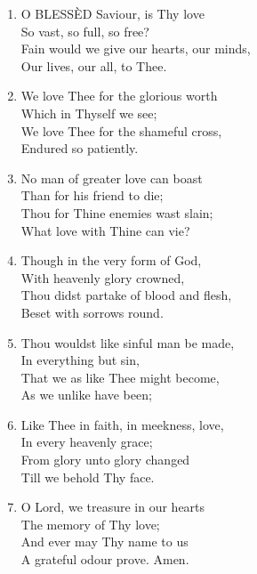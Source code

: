 \begin{enumerate}
    \item O BLESS\`ED Saviour, is Thy love \\
            So vast, so full, so free? \\
        Fain would we give our hearts, our minds, \\
            Our lives, our all, to Thee.

    \item We love Thee for the glorious worth \\
            Which in Thyself we see; \\
        We love Thee for the shameful cross, \\
            Endured so patiently.

    \item No man of greater love can boast \\
            Than for his friend to die; \\
        Thou for Thine enemies wast slain; \\
            What love with Thine can vie?

    \item Though in the very form of God, \\
            With heavenly glory crowned, \\
        Thou didst partake of blood and flesh, \\
            Beset with sorrows round.

    \item Thou wouldst like sinful man be made, \\
            In everything but sin, \\
        That we as like Thee might become, \\
            As we unlike have been;

    \item Like Thee in faith, in meekness, love, \\
            In every heavenly grace; \\
        From glory unto glory changed \\
            Till we behold Thy face.

    \item O Lord, we treasure in our hearts \\
            The memory of Thy love; \\
        And ever may Thy name to us \\
            A grateful odour prove. Amen.

\end{enumerate}


